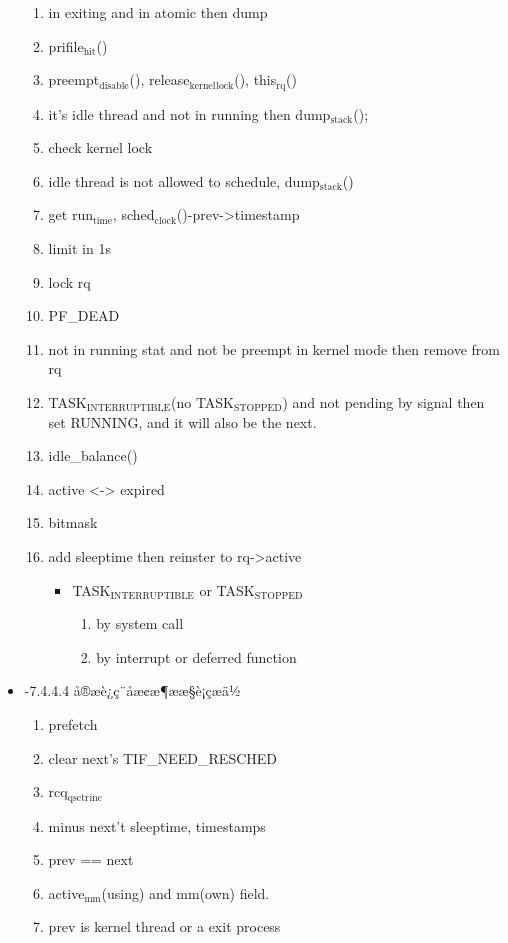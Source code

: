 \documentclass[11pt]{article}
\begin{document}
\begin{itemize}
\begin{enumerate}
\item in exiting and in atomic then dump
\item prifile$_{\mathrm{hit}}$()
\item preempt$_{\mathrm{disable}}$(), release$_{\mathrm{kernel}}$$_{\mathrm{lock}}$(), this$_{\mathrm{rq}}$()
\item it's idle thread and not in running then dump$_{\mathrm{stack}}$();
\item check kernel lock
\item idle thread is not allowed to schedule, dump$_{\mathrm{stack}}$()
\item get run$_{\mathrm{time}}$, sched$_{\mathrm{clock}}$()-prev->timestamp
\item limit in 1s
\item lock rq
\item PF\_DEAD
\item not in running stat and not be preempt in kernel mode then remove from rq
\item TASK$_{\mathrm{INTERRUPTIBLE}}$(no TASK$_{\mathrm{STOPPED}}$) and not pending by signal then
    set RUNNING, and it will also be the next.
\item idle\_balance()
\item active <-> expired
\item bitmask
\item add sleeptime then reinster to rq->active

\begin{itemize}
\item TASK$_{\mathrm{INTERRUPTIBLE}}$ or TASK$_{\mathrm{STOPPED}}$

\begin{enumerate}
\item by system call
\item by interrupt or deferred function
\end{enumerate}

\end{itemize}

\end{enumerate}

\item -7.4.4.4 å®æè¿ç¨åæ¢æ¶ææ§è¡çæä½\\
\label{sec-2.4.4.4}

\begin{enumerate}
\item prefetch
\item clear next's  TIF\_NEED\_RESCHED
\item rcq$_{\mathrm{qsctr}}$$_{\mathrm{inc}}$
\item minus next't sleeptime, timestamps
\item prev == next
\item active$_{\mathrm{mm}}$(using) and mm(own) field.
\item prev is kernel thread or a exit process


\end{enumerate}
\end{itemize}
\end{document}

